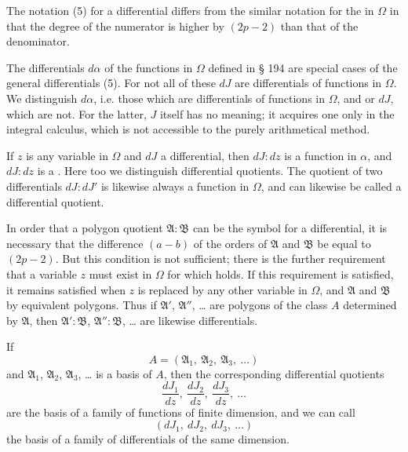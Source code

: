 
The notation (5) for a differential differs from the similar notation for
the  in $\Omega$ in that the degree of the numerator is higher by
$(2p - 2)$ than that of the denominator.

The differentials $d\alpha$ of the functions in $\Omega$ defined in § 194
are special cases of the general differentials (5). For not all of these
$dJ$ are differentials of functions in $\Omega$. We distinguish  $d\alpha$, i.e. those which are differentials of functions
in $\Omega$, and  or  $dJ$, which are not.
For the latter, $J$ itself has no meaning; it acquires one only in the
integral calculus, which is not accessible to the purely arithmetical
method.

If $z$ is any variable in $\Omega$ and $dJ$ a differential, then $dJ:dz$
is a function in $\alpha$,
and $dJ:dz$ is a . Here
too we distinguish  differential quotients. The
quotient of two differentials $dJ:dJ'$ is likewise always a function in
$\Omega$, and can likewise be called a differential quotient.

In order that a polygon quotient $\mathfrak{A}:\mathfrak{B}$ can be the
symbol for a differential, it is necessary that the difference $(a - b)$
of the orders of $\mathfrak{A}$ and $\mathfrak{B}$ be equal to $(2p - 2)$.
But this condition is not sufficient; there is the further requirement
that a variable $z$ must exist in $\Omega$ for which
holds. If this requirement is satisfied, it remains satisfied when
$z$ is replaced by any other variable in $\Omega$, and $\mathfrak{A}$ and $\mathfrak{B}$ by
equivalent polygons. Thus if $\mathfrak{A}'$, $\mathfrak{A}''$, \dots{} are polygons
of the class $A$ determined by $\mathfrak{A}$, then $\mathfrak{A}':\mathfrak{B}$, $\mathfrak{A}'':\mathfrak{B}$, \dots{}
are likewise differentials.

If
\[ A = (\mathfrak{A}_1,\ \mathfrak{A}_2,\ \mathfrak{A}_3,\ \dots) \]
and $\mathfrak{A}_1$, $\mathfrak{A}_2$, $\mathfrak{A}_3$, \dots{} is a basis of $A$, then the corresponding
differential quotients
\[ \frac{dJ_1}{dz},\ \frac{dJ_2}{dz},\ \frac{dJ_3}{dz},\ \dots \]
are the basis of a family of functions of finite dimension, and we can
call
\[ (dJ_1,\ dJ_2,\ dJ_3,\ \dots) \]
the basis of a family of differentials of the same dimension.
